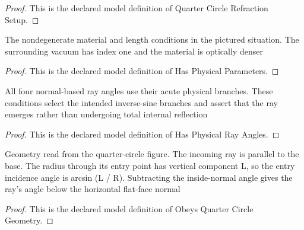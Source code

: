 \begin{proof}
  This is the declared model definition of Quarter Circle Refraction Setup.
\end{proof}
\begin{definition}
  \label{def:physics:phyx-mini-0018:phyxminiproblems-problemphyxmini0018-hasphysicalparameters}
  The nondegenerate material and length conditions in the pictured situation. The surrounding vacuum has index one and the material is optically denser
\end{definition}
\begin{proof}
  This is the declared model definition of Has Physical Parameters.
\end{proof}
\begin{definition}
  \label{def:physics:phyx-mini-0018:phyxminiproblems-problemphyxmini0018-hasphysicalrayangles}
  All four normal-based ray angles use their acute physical branches. These conditions select the intended inverse-sine branches and assert that the ray emerges rather than undergoing total internal reflection
\end{definition}
\begin{proof}
  This is the declared model definition of Has Physical Ray Angles.
\end{proof}
\begin{definition}
  \label{def:physics:phyx-mini-0018:phyxminiproblems-problemphyxmini0018-obeysquartercirclegeometry}
  Geometry read from the quarter-circle figure. The incoming ray is parallel to the base. The radius through its entry point has vertical component L, so the entry incidence angle is arcsin (L / R). Subtracting the inside-normal angle gives the ray's angle below the horizontal flat-face normal
\end{definition}
\begin{proof}
  This is the declared model definition of Obeys Quarter Circle Geometry.
\end{proof}
